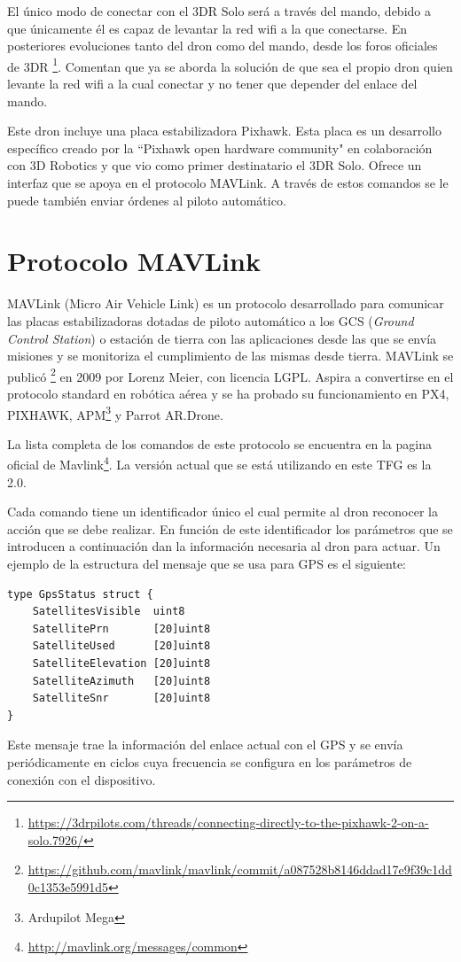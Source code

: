 El único modo de conectar con el 3DR Solo será a través del mando, debido a que únicamente él es capaz de levantar la red wifi a la que conectarse. En posteriores evoluciones tanto del dron como del mando, desde los foros oficiales de 3DR \footnote{\url{https://3drpilots.com/threads/connecting-directly-to-the-pixhawk-2-on-a-solo.7926/}}. Comentan que ya se aborda la solución de que sea el propio dron quien levante la red wifi a la cual conectar y no tener que depender del enlace del mando.

Este dron incluye una placa estabilizadora Pixhawk. Esta placa es un desarrollo específico creado por la ``Pixhawk\cite{pixhawk} open hardware community" en colaboración con 3D Robotics y que vio como primer destinatario el 3DR Solo. Ofrece un interfaz que se apoya en el protocolo MAVLink. A través de estos comandos se le puede también enviar órdenes al piloto automático. 

\section{Protocolo MAVLink}
\label{sec:mavlink}

MAVLink\cite{mavlink} (Micro Air Vehicle Link) es un protocolo desarrollado para comunicar las placas estabilizadoras dotadas de piloto automático a los GCS (\textit{Ground Control Station}) o estación de tierra con las aplicaciones desde las que se envía misiones y se monitoriza el cumplimiento de las mismas desde tierra.
MAVLink se publicó \footnote{\url{https://github.com/mavlink/mavlink/commit/a087528b8146ddad17e9f39c1dd0c1353e5991d5}} en 2009 por Lorenz Meier, con licencia LGPL. Aspira a convertirse en el protocolo standard en robótica aérea y se ha probado su funcionamiento en PX4, PIXHAWK, APM\footnote{Ardupilot Mega} y Parrot AR.Drone.

La lista completa de los comandos de este protocolo se encuentra en la pagina oficial de Mavlink\footnote{\url{http://mavlink.org/messages/common}}. La versión actual que se está utilizando en este TFG es la 2.0. 

Cada comando tiene un identificador único  el cual permite al dron reconocer la acción que se debe realizar. En función de este identificador los parámetros que se introducen a continuación dan la información necesaria al dron para actuar. Un ejemplo de la estructura del mensaje que se usa para GPS es el siguiente:
\begin{lstlisting}[frame=single]
type GpsStatus struct {
    SatellitesVisible  uint8      
    SatellitePrn       [20]uint8  
    SatelliteUsed      [20]uint8  
    SatelliteElevation [20]uint8  
    SatelliteAzimuth   [20]uint8  
    SatelliteSnr       [20]uint8  
}
\end{lstlisting}
Este mensaje trae la información del enlace actual con el GPS y se envía periódicamente en ciclos cuya frecuencia se configura en los parámetros de conexión con el dispositivo.

